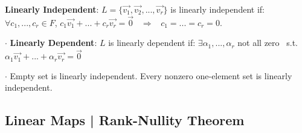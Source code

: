 \documentclass[9pt]{article}
\begin{document}
\textbf{Linearly Independent}: $L=\{\vec{v_1},\vec{v_2},...,\vec{v_r}\}$ is linearly independent if: \ $\forall c_1,...,c_r\in F$, $c_1\vec{v_1}+...+c_r\vec{v_r}=\vec{0}$ \ $\Rightarrow$ \ $c_1=...=c_r=0$.

$\cdot$ \textbf{Linearly Dependent}: $L$ is linearly dependent if: $\exists \alpha_1,...,\alpha_r$ not all zero \ s.t. \ $\alpha_1\vec{v_1}+...+\alpha_r\vec{v_r}=\vec{0}$

$\cdot$ Empty set is linearly independent. \quad \quad \quad Every nonzero one-element set is linearly independent.



\subsection{Linear Maps | Rank-Nullity Theorem}
\end{document}
